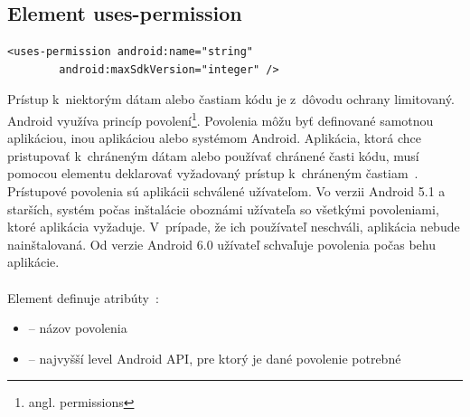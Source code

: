 \subsection{Element uses-permission}
\label{el_uses-permission}
\lstset{language=XML}
\begin{lstlisting}
<uses-permission android:name="string"
        android:maxSdkVersion="integer" />
\end{lstlisting}
Prístup k~niektorým dátam alebo častiam kódu je z~dôvodu ochrany limitovaný. Android využíva princíp povolení\footnote{angl. permissions}. Povolenia môžu byť definované samotnou aplikáciou, inou aplikáciou alebo systémom Android. Aplikácia, ktorá chce pristupovať k~chráneným dátam alebo používať chránené časti kódu, musí pomocou elementu  deklarovať vyžadovaný prístup k~chráneným častiam~\cite{appManifest}. Prístupové povolenia sú aplikácii schválené užívateľom. Vo verzii Android 5.1 a starších, systém počas inštalácie oboznámi užívateľa so všetkými povoleniami, ktoré aplikácia vyžaduje. V~prípade, že ich používateľ neschváli, aplikácia nebude nainštalovaná. Od verzie Android 6.0 užívateľ schvaľuje povolenia počas behu aplikácie.\\\\ 
Element  definuje atribúty~\cite{elUsesPerm}:\\
\begin{itemize}
\item {} -- názov povolenia
\item {} -- najvyšší level Android API, pre ktorý je dané povolenie potrebné
\end{itemize}

